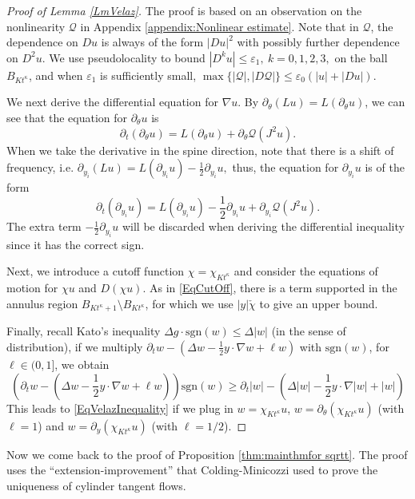 \documentclass[11pt]{amsart}
\numberwithin{equation}{section}
\numberwithin{equation}{section}
\newcommand{\eps}{\varepsilon}
\newcommand{\pr}{\partial}
\begin{document}
	\begin{proof}[Proof of Lemma \ref{LmVelaz}]
		The proof is based on an observation on the nonlinearity $\mathcal Q$ in Appendix \ref{appendix:Nonlinear estimate}. 
		Note that in $\mathcal Q$, the dependence on $Du$ is always of the form $|Du|^2$ with possibly further dependence on $D^2u.$ We use pseudolocality to bound $|D^ku|\leq \eps_1,\ k=0, 1,2,3,$ on the ball $B_{Kt^\kappa}$, and when $\eps_1$ is sufficiently small, $\max\{|\mathcal Q|,|D\mathcal Q|\}\leq \eps_0 (|u|+|Du|).$
		
		We next derive the differential equation for $\nabla u$. By $\pr_\theta(Lu)=L(\pr_\theta u)$, we can see that the equation for $\pr_\theta u$ is $$\partial_t (\pr_\theta u)=L (\pr_\theta u)+\pr_{\theta}\mathcal{Q}(J^2u).$$ When we take the derivative in the spine direction, note that there is a shift of frequency, i.e. $\pr_{y_i}(Lu)=L(\pr_{y_i}u)-\frac{1}{2}\pr_{y_i}u,$ thus, the equation for $\pr_{y_i}u$ is of the form $$\partial_t (\pr_{y_i}u)=L (\pr_{y_i} u)-\frac{1}{2}\pr_{y_i} u+\pr_{y_i}\mathcal{Q}(J^2u).$$
		The extra term $-\frac{1}{2}\pr_{y_i} u$ will be discarded when deriving the differential inequality since it has the correct sign. 
		
		Next, we introduce a cutoff function $\chi=\chi_{Kt^\kappa}$ and consider the equations of motion for $\chi u$ and $D(\chi u)$. As in \eqref{EqCutOff}, there is a term supported in the annulus region $B_{Kt^\kappa+1}\setminus B_{Kt^\kappa}$, for which we use $|y|\check\chi$ to give an upper bound. 
		
		Finally, recall Kato's inequality $\Delta g\cdot \text{sgn}(w)\leq \Delta|w|$ (in the sense of distribution), if we multiply $\pr_tw-(\Delta w-\frac{1}{2}y\cdot\nabla w+\ell w)$ with $\text{sgn}(w)$, for $\ell\in(0,1]$, we obtain 
		\[
		\left(\pr_tw-(\Delta w-\frac{1}{2}y\cdot\nabla w+\ell w)\right)\text{sgn}(w)
		\geq
		\pr_t|w|-(\Delta |w|-\frac{1}{2}y\cdot\nabla |w|+|w|)
		\]
		This leads to \eqref{EqVelazInequality} if we plug in $w=\chi_{Kt^\kappa}u$, $w=\pr_\theta (\chi_{Kt^\kappa}u)$ (with $\ell=1$) and $w=\pr_y(\chi_{Kt^\kappa}u)$ (with $\ell=1/2$).
	\end{proof}
	
	Now we come back to the proof of Proposition \ref{thm:mainthmfor sqrtt}. The proof uses the ``extension-improvement'' that Colding-Minicozzi \cite{CM2} used to prove the uniqueness of cylinder tangent flows. 
	
\end{document}
